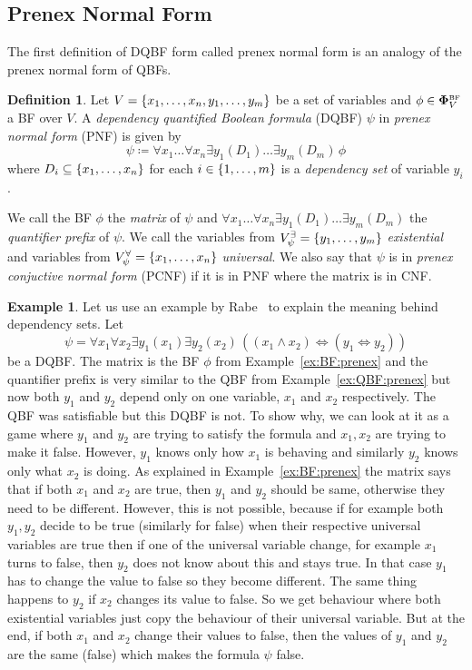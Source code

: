 \documentclass[
  digital, %
  twoside, %
  table,   %
  nolof,     %
  nolot,     %
]{fithesis3}
\let\setbuilder\set
\newcommand{\simpleset}[1]{\{{#1}\}}
\renewcommand{\set}[1]{\normalexpandarg\IfSubStr{#1}{|}{\setbuilder{#1}}{\simpleset{#1}}}
\theoremstyle{definition}
\newtheorem{definition}{Definition}
\newtheorem{example}{Example}
\theoremstyle{remark}
\newcommand{\BF}[1]{\mathbf{\Phi}_{#1}^{\normalfont{\text{\tiny BF}}}}
\newcommand{\evars}[1]{V_{#1}^{\exists}}
\newcommand{\uvars}[1]{V_{#1}^{\forall}}
\newcommand{\lequal}{\Leftrightarrow}
\newcommand{\itholds}{\,}
\begin{document}
\subsection{Prenex Normal Form}
The first definition of DQBF form called prenex normal form is an analogy of the prenex normal form of QBFs.


\begin{definition}
  Let $V = \set{x_1, \dots, x_n, y_1, \dots, y_m}$ be a set of variables and $\phi \in \BF{V}$ a BF over $V$. A \emph{dependency quantified Boolean formula} (DQBF) $\psi$ in \emph{prenex normal form} (PNF) is given by
  \[\psi \coloneqq \forall x_1 \dots \forall x_n \exists y_1 (D_1) \dots \exists y_m (D_m) \itholds \phi\]
  where $D_i \subseteq \set{x_1, \dots, x_n}$ for each $i \in \set{1,\dots,m}$ is a \emph{dependency set} of variable $y_i$.
  \label{def:DQBF:PNF}
\end{definition}
We call the BF $\phi$ the \emph{matrix} of $\psi$ and $\forall x_1 \dots \forall x_n \exists y_1 (D_1) \dots \exists y_m (D_m)$ the \emph{quantifier prefix} of $\psi$. We call the variables from $\evars{\psi} = \set{y_1,\dots,y_m}$ \emph{existential} and variables from $\uvars{\psi} = \set{x_1,\dots,x_n}$ \emph{universal}. We also say that $\psi$ is in \emph{prenex conjuctive normal form} (PCNF) if it is in PNF where the matrix is in CNF.



\begin{example}
Let us use an example by Rabe~\cite{DQBFProofSystem} to explain the meaning behind dependency sets. Let 
\[\psi = \forall x_1 \forall x_2 \exists y_1 (x_1) \exists y_2 (x_2) \itholds ((x_1 \land x_2) \lequal (y_1 \lequal y_2))\]
be a DQBF. The matrix is the BF $\phi$ from Example~\ref{ex:BF:prenex} and the quantifier prefix is very similar to the QBF from Example~\ref{ex:QBF:prenex} but now both $y_1$ and $y_2$ depend only on one variable, $x_1$ and $x_2$ respectively. The QBF was satisfiable but this DQBF is not. To show why, we can look at it as a game where $y_1$  and $y_2$ are trying to satisfy the formula and $x_1,x_2$ are trying to make it false. However, $y_1$ knows only how $x_1$ is behaving and similarly $y_2$ knows only what $x_2$ is doing. As explained in Example~\ref{ex:BF:prenex} the matrix says that if both $x_1$ and $x_2$ are true, then $y_1$ and $y_2$ should be same, otherwise they need to be different. However, this is not possible, because if for example both $y_1,y_2$ decide to be true (similarly for false) when their respective universal variables are true then if one of the universal variable change, for example $x_1$ turns to false, then $y_2$ does not know about this and stays true. In that case $y_1$ has to change the value to false so they become different. The same thing happens to $y_2$ if $x_2$ changes its value to false. So we get behaviour where both existential variables just copy the behaviour of their universal variable. But at the end, if both $x_1$ and $x_2$ change their values to false, then the values of $y_1$ and $y_2$ are the same (false) which makes the formula $\psi$ false.
\end{example}
\end{document}
